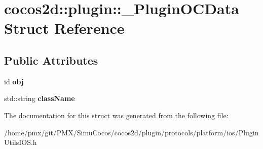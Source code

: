 \hypertarget{structcocos2d_1_1plugin_1_1__PluginOCData}{}\section{cocos2d\+:\+:plugin\+:\+:\+\_\+\+Plugin\+O\+C\+Data Struct Reference}
\label{structcocos2d_1_1plugin_1_1__PluginOCData}
\subsection*{Public Attributes}
\begin{DoxyCompactItemize}
\item 
\mbox{\label{structcocos2d_1_1plugin_1_1__PluginOCData_a8c5a079c0734ee48c96f62044d04155b}} 
id {\bfseries obj}
\item 
\mbox{\label{structcocos2d_1_1plugin_1_1__PluginOCData_a2269dbec6f47b54d99e7f765e4c89ed7}} 
std\+::string {\bfseries class\+Name}
\end{DoxyCompactItemize}


The documentation for this struct was generated from the following file\+:\begin{DoxyCompactItemize}
\item 
/home/pmx/git/\+P\+M\+X/\+Simu\+Cocos/cocos2d/plugin/protocols/platform/ios/Plugin\+Utils\+I\+O\+S.\+h\end{DoxyCompactItemize}
